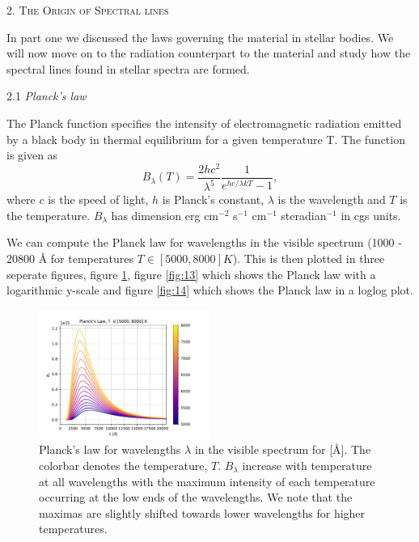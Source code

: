 \documentclass[a4paper,11.5pt,]{article}
\begin{document}
\begin{multicols}{2}
\begin{center}
\textsc{2. The Origin of Spectral lines}
\end{center}
In part one we discussed the laws governing the material in stellar bodies. We will now move on to the radiation counterpart to the material and study how the spectral lines found in stellar spectra are formed.

\begin{center}
2.1\textit{ Planck's law}
\end{center}
The Planck function specifies the intensity of electromagnetic radiation emitted by a black body in thermal equilibrium for a given temperature T. The function is given as
\begin{equation}\label{eq:}
    B_\lambda (T) = \frac{2hc^2}{\lambda^5} \frac{1}{e^{hc/\lambda kT} - 1},
\end{equation}
where $c$ is the speed of light, $h$ is Planck's constant, $\lambda$ is the wavelength and $T$ is the temperature. $B_\lambda$ has dimension erg cm$^{-2}$ s$^{-1}$ cm$^{-1}$ steradian$^{-1}$ in cgs units.

We can compute the Planck law for wavelengths in the visible spectrum (1000 - 20800 Å for temperatures $T \in [5000, 8000] K$). This is then plotted in three seperate figures, figure \ref{fig:12}, figure \ref{fig:13} which shows the Planck law with a logarithmic y-scale and figure \ref{fig:14} which shows the Planck law in a loglog plot.

\begin{figure}[H]
	\centering
	\includegraphics[width=0.5\textwidth]{SSA/figures/planck.pdf}
	\caption{Planck's law for wavelengths $\lambda$ in the visible spectrum for [Å]. The colorbar denotes the temperature, $T$. $B_\lambda$ increase with temperature at all wavelengths with the maximum intensity of each temperature occurring at the low ends of the wavelengths. We note that the maximas are slightly shifted towards lower wavelengths for higher temperatures. }
	\label{fig:12}
\end{figure}


\end{multicols}
\end{document}
